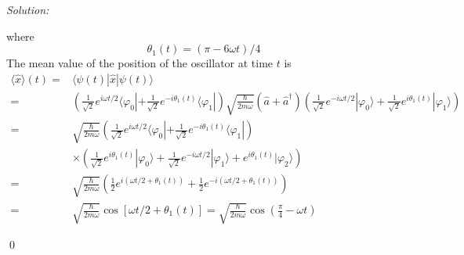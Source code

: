 \documentclass[12pt,a4paper]{article}
\newenvironment{sol}
    {\emph{Solution:}
    }
    {
    \qed
    }
\begin{document}
\begin{sol}
\begin{itemize}
where
\begin{equation}
\theta_1(t)=(\pi-6\omega t)/4
\end{equation}
The mean value of the position of the oscillator at time $t$ is
\begin{align}
\nonumber\langle\hat{x}\rangle(t)=&\langle\psi(t)|\hat{x}|\psi(t)\rangle\\
\nonumber=&(\frac{1}{\sqrt{2}}e^{i\omega t/2}\langle\varphi_0|+\frac{1}{\sqrt{2}}e^{-i\theta_1(t)}\langle\varphi_1|)\sqrt{\frac{\hbar}{2m\omega}}(\hat{a}+\hat{a}^{\dagger})(\frac{1}{\sqrt{2}}e^{-i\omega t/2}|\varphi_0\rangle+\frac{1}{\sqrt{2}}e^{i\theta_1(t)}|\varphi_1\rangle)\\
\nonumber=&\sqrt{\frac{\hbar}{2m\omega}}(\frac{1}{\sqrt{2}}e^{i\omega t/2}\langle\varphi_0|+\frac{1}{\sqrt{2}}e^{-i\theta_1(t)}\langle\varphi_1|)\\
\nonumber&\times(\frac{1}{\sqrt{2}}e^{i\theta_1(t)}|\varphi_0\rangle+\frac{1}{\sqrt{2}}e^{-i\omega t/2}|\varphi_1\rangle+e^{i\theta_1(t)}|\varphi_2\rangle)\\
\nonumber=&\sqrt{\frac{\hbar}{2m\omega}}(\frac{1}{2}e^{i(\omega t/2+\theta_1(t))}+\frac{1}{2}e^{-i(\omega t/2+\theta_1(t))})\\
=&\sqrt{\frac{\hbar}{2m\omega}}\cos[\omega t/2+\theta_1(t)]=\sqrt{\frac{\hbar}{2m\omega}}\cos(\frac{\pi}{4}-\omega t)
\end{align}
\end{itemize}
\end{sol}
\end{document}
